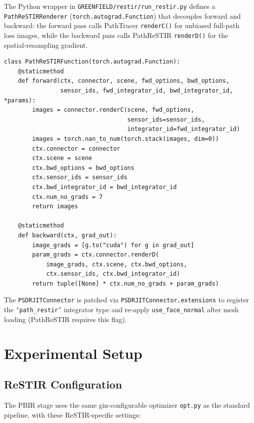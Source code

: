 The Python wrapper in \texttt{GREENFIELD/restir/run\_restir.py} defines a
\texttt{PathReSTIRRenderer} (\texttt{torch.autograd.Function}) that decouples
forward and backward: the forward pass calls PathTracer \texttt{renderC()} for
unbiased full-path loss images, while the backward pass calls PathReSTIR
\texttt{renderD()} for the spatial-resampling gradient.

\begin{lstlisting}[caption={PathReSTIRRenderer --- \texttt{torch.autograd.Function} wrapping PathTracer forward and PathReSTIR backward.},label={lst:renderer},float,floatplacement=t]
class PathReSTIRFunction(torch.autograd.Function):
    @staticmethod
    def forward(ctx, connector, scene, fwd_options, bwd_options,
                sensor_ids, fwd_integrator_id, bwd_integrator_id, *params):
        images = connector.renderC(scene, fwd_options,
                                   sensor_ids=sensor_ids,
                                   integrator_id=fwd_integrator_id)
        images = torch.nan_to_num(torch.stack(images, dim=0))
        ctx.connector = connector
        ctx.scene = scene
        ctx.bwd_options = bwd_options
        ctx.sensor_ids = sensor_ids
        ctx.bwd_integrator_id = bwd_integrator_id
        ctx.num_no_grads = 7
        return images

    @staticmethod
    def backward(ctx, grad_out):
        image_grads = [g.to("cuda") for g in grad_out]
        param_grads = ctx.connector.renderD(
            image_grads, ctx.scene, ctx.bwd_options,
            ctx.sensor_ids, ctx.bwd_integrator_id)
        return tuple([None] * ctx.num_no_grads + param_grads)
\end{lstlisting}

The \texttt{PSDRJITConnector} is patched via
\texttt{PSDRJITConnector.extensions} to register the \texttt{'path\_restir'}
integrator type and re-apply \texttt{use\_face\_normal} after mesh loading
(PathReSTIR requires this flag).

\section{Experimental Setup}

\subsection{ReSTIR Configuration}

The PBIR stage uses the same gin-configurable optimizer \texttt{opt.py} as the
standard pipeline, with these ReSTIR-specific settings:

